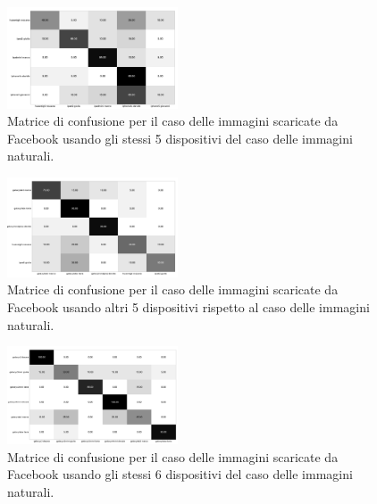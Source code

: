 \begin{figure}[h]
\begin{center}
\includegraphics[width=0.45\textwidth]{images/confusion_matrix_fb_highres_5.png}
\end{center}
  \caption{Matrice di confusione per il caso delle immagini scaricate da Facebook usando gli stessi 5 dispositivi del caso delle immagini naturali.}
\label{fig:validation}
\end{figure}

\begin{figure}[h]
\begin{center}
\includegraphics[width=0.45\textwidth]{images/confusion_matrix_fb_highres_5_bis.png}
\end{center}
  \caption{Matrice di confusione per il caso delle immagini scaricate da Facebook usando altri 5 dispositivi rispetto al caso delle immagini naturali. }
\label{fig:validation}
\end{figure}

\begin{figure}[h]
\begin{center}
\includegraphics[width=0.45\textwidth]{images/confusion_matrix_fb_highres_6.png}
\end{center}
  \caption{Matrice di confusione per il caso delle immagini scaricate da Facebook usando gli stessi 6 dispositivi del caso delle immagini naturali.}
\label{fig:validation}
\end{figure}


